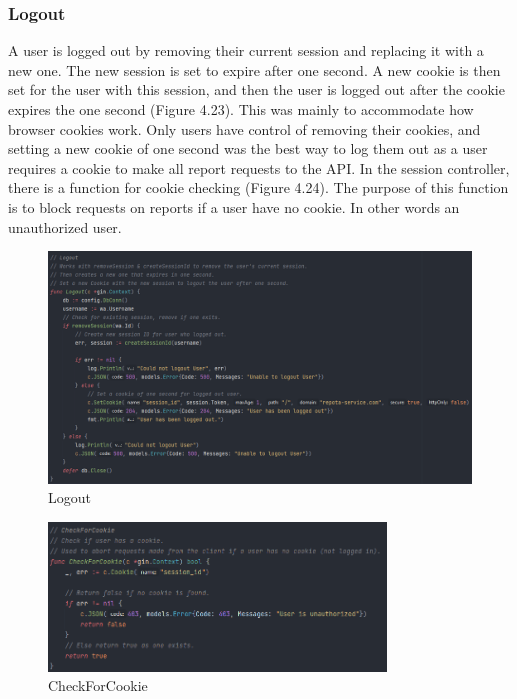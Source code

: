 \subsubsection{Logout}
A user is logged out by removing their current session and replacing it with a new one. The new session is set to expire after one second. A new cookie is then set for the user with this session, and then the user is logged out after the cookie expires the one second (Figure 4.23). This was mainly to accommodate how browser cookies work. Only users have control of removing their cookies, and setting a new cookie of one second was the best way to log them out as a user requires a cookie to make all report requests to the API. In the session controller, there is a function for cookie checking (Figure 4.24). The purpose of this function is to block requests on reports if a user have no cookie. In other words an unauthorized user.

\begin{figure}[H]
    \caption{Logout}
    \label{image:logout}
    \centering
    \includegraphics[width=1.0\textwidth]{images/horton/account_system/logout_func.png}
\end{figure}

\begin{figure}[H]
    \caption{CheckForCookie}
    \label{image:cookieCheck}
    \centering
    \includegraphics[width=0.8\textwidth]{images/horton/account_system/check_cookie.png}
\end{figure}

